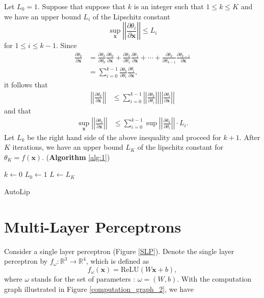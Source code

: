 \documentclass[12pt]{report}
\numberwithin{figure}{chapter}
\theoremstyle{plain}
\theoremstyle{definition}
\theoremstyle{corollary}
\theoremstyle{definition}
\theoremstyle{plain}
\theoremstyle{definition}
\theoremstyle{plain}
\newcommand\bx{\ensuremath{\boldsymbol x}}
\newcommand\lip{\ensuremath{\text{Lip}}}
\begin{document}
Let \(L_0=1\).
Suppose that suppose that \(k\) is an integer such that \(1\le k\le K\) and we have an upper bound \(L_i\) of the Lipschitz constant
\[\sup_{\boldsymbol x}\left|\left|\frac{\partial\theta_i}{\partial\boldsymbol x}\right|\right|\le L_i\]
for \(1\le i\le k-1\).
Since
\begin{align*}
\frac{\partial \theta_k}{\partial\boldsymbol x}
&=\frac{\partial\theta_k}{\partial\theta_0}\frac{\partial\theta_0}{\partial\boldsymbol x}
+\frac{\partial\theta_k}{\partial\theta_1}\frac{\partial\theta_1}{\partial\boldsymbol x}
+\cdots
+\frac{\partial\theta_k}{\partial\theta_{k-1}}\frac{\partial\theta_{k-1}}{\partial\boldsymbol x}\\
&=\sum_{i=0}^{k-1}\frac{\partial\theta_k}{\partial\theta_i}\frac{\partial\theta_i}{\partial\boldsymbol x},
\end{align*}
it follows that
\begin{align*}
\left|\left|\frac{\partial \theta_k}{\partial\boldsymbol x}\right|\right|
&\le\sum_{i=0}^{k-1}
\left|\left|\frac{\partial\theta_k}{\partial\theta_i}\right|\right|
\left|\left|\frac{\partial\theta_i}{\partial\boldsymbol x}\right|\right|
\end{align*}
and that
\begin{align*}
\sup_{\boldsymbol x}\left|\left|\frac{\partial \theta_k}{\partial\boldsymbol x}\right|\right|
&\le\sum_{i=0}^{k-1}
\sup\left|\left|\frac{\partial\theta_k}{\partial\theta_i}\right|\right|\cdot L_i.
\end{align*}
Let \(L_k\) be the right hand side of the above inequality and proceed for \(k+1\).
After \(K\) iterations, we have an upper bound \(L_K\) of the lipschitz constant for \(\theta_K=f(\boldsymbol x)\).
(\textbf{Algorithm} \ref{alg:1})

\begin{algorithm}
\KwResult{An upper bound \(L\) for \(\lip(f)\)}
\(k\gets 0\)\;
\(L_0\gets1\)\;
\(L\gets L_K\)
\caption{AutoLip}
\label{alg:1}
\end{algorithm}


\section{Multi-Layer Perceptrons}
Consider a single layer perceptron (Figure \ref{SLP}).
Denote the single layer perceptron by \(f_\omega:\mathbb R^3\to\mathbb R^4\), which is defined as
\[f_\omega(\bx)=\text{ReLU}(W\bx+b),\]
where \(\omega\) stands for the set of parameters : \(\omega=(W,b)\).
With the computation graph illustrated in Figure \ref{computation_graph_2}, we have
\end{document}
